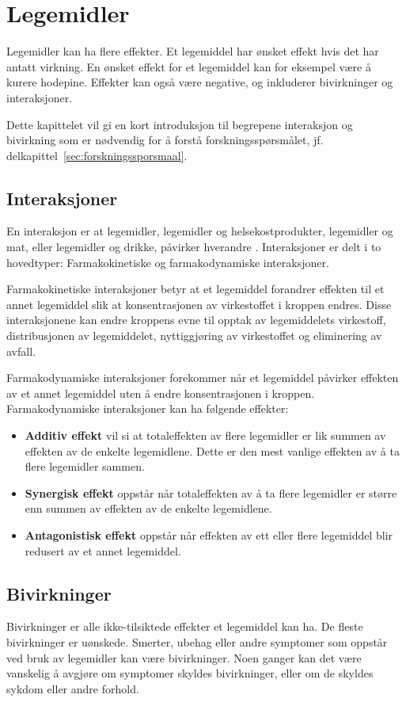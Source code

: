 \chapter{Legemidler} \label{chap:bakgrunn_helsefaglig}
Legemidler kan ha flere effekter. Et legemiddel har ønsket effekt hvis det har antatt virkning. En ønsket effekt for et legemiddel kan for eksempel være å kurere hodepine. Effekter kan også være negative, og inkluderer bivirkninger og interaksjoner.

Dette kapittelet vil gi en kort introduksjon til begrepene interaksjon og bivirkning som er nødvendig for å forstå forskningsspørsmålet, jf. delkapittel~\ref{sec:forskningssporsmaal}.

\section{Interaksjoner}
En interaksjon er at legemidler, legemidler og helsekostprodukter, legemidler og mat, eller legemidler og drikke, påvirker hverandre \citep{Stockley}. Interaksjoner er delt i to hovedtyper: Farmakokinetiske og farmakodynamiske interaksjoner. 

Farmakokinetiske interaksjoner betyr at et legemiddel forandrer effekten til et annet legemiddel slik at konsentrasjonen av virkestoffet i kroppen endres. Disse interaksjonene kan endre kroppens evne til opptak av legemiddelets virkestoff, distribusjonen av legemiddelet, nyttiggjøring av virkestoffet og eliminering av avfall. 

Farmakodynamiske interaksjoner forekommer når et legemiddel påvirker effekten av et annet legemiddel uten å endre konsentrasjonen i kroppen. Farmakodynamiske interaksjoner kan ha følgende effekter:
\begin{itemize}
\item \textbf{Additiv effekt} vil si at totaleffekten av flere legemidler er lik summen av effekten av de enkelte legemidlene. Dette er den mest vanlige effekten av å ta flere legemidler sammen. 
\item \textbf{Synergisk effekt} oppstår når totaleffekten av å ta flere legemidler er større enn summen av effekten av de enkelte legemidlene. 
\item \textbf{Antagonistisk effekt} oppstår når effekten av ett eller flere legemiddel blir redusert av et annet legemiddel.
\end{itemize}

\section{Bivirkninger}
Bivirkninger er alle ikke-tilsiktede effekter et legemiddel kan ha. De fleste bivirkninger er uønskede. Smerter, ubehag eller andre symptomer som oppstår ved bruk av legemidler kan være bivirkninger. Noen ganger kan det være vanskelig å avgjøre om symptomer skyldes bivirkninger, eller om de skyldes sykdom eller andre forhold.

